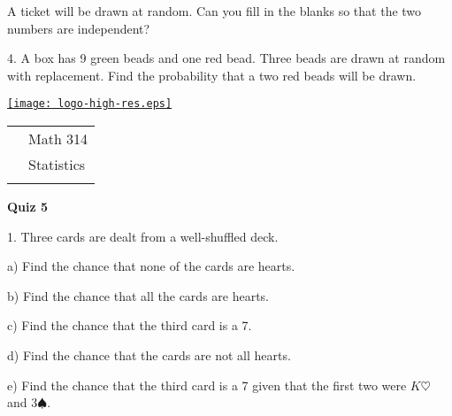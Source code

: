 \documentclass[10pt]{article}
\begin{document}
A ticket will be drawn at random.  Can you fill in the blanks so that 
the two numbers are independent?
\vspace{1in}

4. A box has 9 green beads and one red bead.  Three beads are drawn at random with replacement.
Find the probability that a two red beads will be drawn.

\vfill
\eject          


\pagestyle{empty}
\lstset{language=R, showspaces=false, showstringspaces=false}

\href{http://www.shepherd.edu}{\texttt{[image: logo-high-res.eps]}}
\vspace{-1.79cm}

{\small
\begin{tabular}{cl}
& Math 314\\
& Statistics\\
\hspace{5.28in} & %
\end{tabular}
}
\setlength{\baselineskip}{1.05\baselineskip}

\begin{center}
\textbf{\large  Quiz 5}
\end{center}

1. Three cards are dealt from a well-shuffled deck.
\smallskip

\hspace{20pt} a) Find the chance that none of the cards are hearts.
\vspace{0.75in}

\hspace{20pt} b) Find the chance that all the cards are hearts.
\vspace{0.75in}

\hspace{20pt} c) Find the chance that the third card is a 7.
\vspace{0.75in}

\hspace{20pt} d) Find the chance that the cards are not all hearts.
\vspace{0.75in}

\hspace{20pt} e) Find the chance that the third card is a 7 given that the first two 
were $K\heartsuit$ and $3\spadesuit$.
\vspace{0.75in}
\end{document}
